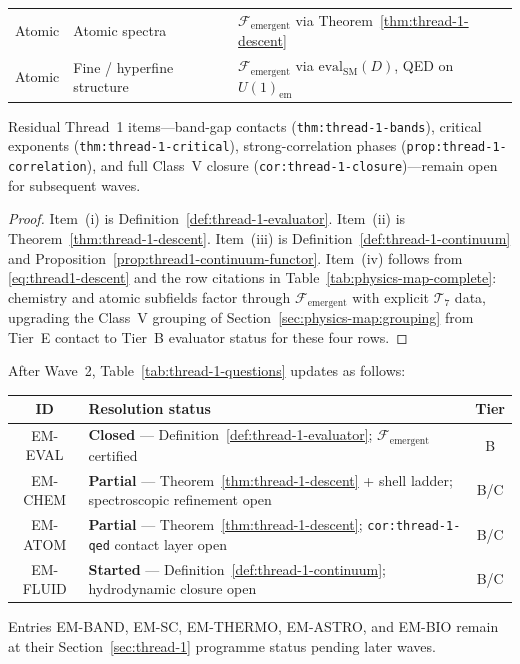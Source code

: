 \begin{corollary}
\begin{enumerate}[label=(\roman*),leftmargin=*]
\begin{center}
\begin{tabular}{@{}lll@{}}
    Atomic & Atomic spectra &
      $\mathcal{F}_{\mathrm{emergent}}$ via
      Theorem~\ref{thm:thread-1-descent} \\
    Atomic & Fine / hyperfine structure &
      $\mathcal{F}_{\mathrm{emergent}}$ via $\mathrm{eval}_{\mathrm{SM}}(D)$,
      QED on $U(1)_{\mathrm{em}}$ \\
    \bottomrule
    \end{tabular}
    \end{center}
\end{enumerate}
Residual Thread~1 items---band-gap contacts (\texttt{thm:thread-1-bands}),
critical exponents (\texttt{thm:thread-1-critical}), strong-correlation phases
(\texttt{prop:thread-1-correlation}), and full Class~V closure
(\texttt{cor:thread-1-closure})---remain open for subsequent waves.
\end{corollary}

\begin{proof}
Item~(i) is Definition~\ref{def:thread-1-evaluator}. Item~(ii) is
Theorem~\ref{thm:thread-1-descent}. Item~(iii) is
Definition~\ref{def:thread-1-continuum} and
Proposition~\ref{prop:thread1-continuum-functor}. Item~(iv) follows from
\eqref{eq:thread1-descent} and the row citations in
Table~\ref{tab:physics-map-complete}: chemistry and atomic subfields factor
through $\mathcal{F}_{\mathrm{emergent}}$ with explicit $\mathcal{T}_7$
data, upgrading the Class~V grouping of
Section~\ref{sec:physics-map:grouping} from Tier~E contact to Tier~B
evaluator status for these four rows.
\end{proof}

\begin{remark}
\label{rmk:thread1-wave2-table}
After Wave~2, Table~\ref{tab:thread-1-questions} updates as follows:
\begin{center}
\small
\begin{tabular}{@{}clc@{}}
\toprule
\textbf{ID} & \textbf{Resolution status} & \textbf{Tier} \\
\midrule
EM-EVAL &
  \textbf{Closed} --- Definition~\ref{def:thread-1-evaluator};
  $\mathcal{F}_{\mathrm{emergent}}$ certified &
  B \\
EM-CHEM &
  \textbf{Partial} --- Theorem~\ref{thm:thread-1-descent} + shell ladder;
  spectroscopic refinement open &
  B/C \\
EM-ATOM &
  \textbf{Partial} --- Theorem~\ref{thm:thread-1-descent};
  \texttt{cor:thread-1-qed} contact layer open &
  B/C \\
EM-FLUID &
  \textbf{Started} --- Definition~\ref{def:thread-1-continuum};
  hydrodynamic closure open &
  B/C \\
\bottomrule
\end{tabular}
\end{center}
Entries EM-BAND, EM-SC, EM-THERMO, EM-ASTRO, and EM-BIO remain at their
Section~\ref{sec:thread-1} programme status pending later waves.
\end{remark}